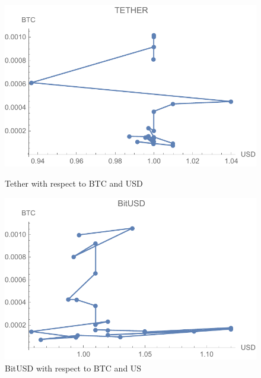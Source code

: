 \begin{figure}[!htb]

	\includegraphics[width=\linewidth]{figures/tether.pdf}
	\caption{Tether with respect to BTC and USD}\label{fig:tether}
	\endminipage\hfill
	\includegraphics[width=\linewidth]{figures/bitusd.pdf}
	\caption{BitUSD with respect to BTC and US}\label{fig:bitusd}
	\endminipage\hfill
\end{figure}


